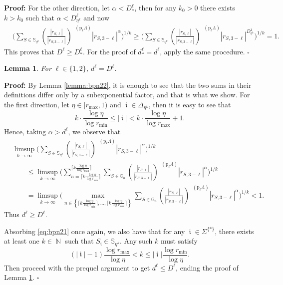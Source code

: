 \documentclass[a4paper, 11pt]{article}
\newenvironment{Proof}{\noindent \textbf{Proof:}}{\hfill$\square$\\}
\DeclareMathOperator{\N}{\mathbb{N}}
\DeclareMathOperator{\iii}{\mathfrak{i}}
\DeclareMathOperator{\dB}{\dim_{\mathrm{B}}}
\numberwithin{equation}{section}
\theoremstyle{plain}
\newtheorem{lemma}[theorem]{Lemma}
\theoremstyle{remark}
\theoremstyle{definition}
\begin{document}
\begin{Proof}
For the other direction, let $\alpha < D_*^\ell$, then for any $k_0 > 0$ there exists $k > k_0$ such that $\alpha< D_{\eta^k}^\ell$ and now
\begin{align*}
&\Bigg( \sum_{S \in \mathbb{S}_{\eta^k}} \left( \frac{|r_{S,\ell}|}{|r_{S,3-\ell}|} \right)^{\dB(\mathrm{p}_\ell\Lambda)} |r_{S,3-\ell}|^{\alpha}\Bigg)^{1/k} \geq \Bigg( \sum_{S \in \mathbb{S}_{\eta^k}} \left( \frac{|r_{S,\ell}|}{|r_{S,3-\ell}|} \right)^{\dB(\mathrm{p}_\ell\Lambda)} |r_{S,3-\ell}|^{D_{\eta^k}^1}\Bigg)^{1/k} = 1.
\end{align*}
This proves that $D^\ell \geq D_*^\ell$. For the proof of $d_*^\ell=d^\ell$, apply the same procedure.
\end{Proof}

\begin{lemma} \label{Lemma:bpn2} For $\ell \in \{1,2\}$, $d^\ell = D^\ell$.
\end{lemma}
\begin{Proof}
By Lemma \ref{lemma:bpn22}, it is enough to see that the two sums in their definitions differ only by a subexponential factor, and that is what we show. For the first direction, let $\eta \in [r_{\max},1)$ and $\iii \in \Delta_{\eta^k}$, then it is easy to see that
\begin{equation}\label{eq:bpn21}
k \cdot \frac{\log \eta}{\log r_{\min}} \leq |\iii| < k \cdot \frac{\log \eta}{\log r_{\max}} + 1.
\end{equation}
Hence, taking $\alpha > d^\ell$, we observe that
\begin{align*}
&\limsup_{k \to \infty} \Bigg( \sum_{S \in \mathbb{S}_{\eta^k}} \left( \frac{|r_{S,\ell}|}{|r_{S,3-\ell}|} \right)^{\dB(\mathrm{p}_\ell\Lambda)} |r_{S,3-\ell}|^{\alpha}\Bigg)^{1/k} \\
& \qquad \leq \limsup_{k \to \infty} \Bigg(\sum_{n = \big\lceil k \frac{\log \eta}{\log r_{\min}} \big\rceil }^{ \big\lceil k \frac{\log \eta}{\log r_{\max}} \big\rceil }\sum_{S \in \mathbb{G}_{n}} \left( \frac{|r_{S,\ell}|}{|r_{S,3-\ell}|} \right)^{\dB(\mathrm{p}_\ell\Lambda)} |r_{S,3-\ell}|^{\alpha}\Bigg)^{1/k} \\
& \qquad = \limsup_{k \to \infty} \Bigg(\max_{n \in\left\{ \big\lceil k \frac{\log \eta}{\log r_{\min}} \big\rceil,\ldots,\big\lceil k \frac{\log \eta}{\log r_{\max}} \big\rceil \right\} }\sum_{S \in \mathbb{G}_{n}} \left( \frac{|r_{S,\ell}|}{|r_{S,3-\ell}|} \right)^{\dB(\mathrm{p}_\ell\Lambda)} |r_{S,3-\ell}|^{\alpha}\Bigg)^{1/k} < 1.
\end{align*}
Thus $d^\ell \geq D^\ell$.

Absorbing \eqref{eq:bpn21} once again, we also have that for any $\iii\in\Sigma^{\{*\}}$, there exists at least one $k\in\N$ such that $S_{\iii}\in\mathbb{S}_{\eta^k}$. Any such $k$ must satisfy
\[ (|\iii|-1) \frac{\log r_{\max}}{\log \eta} < k \leq |\iii|\frac{\log r_{\min}}{\log \eta}.\]
Then proceed with the prequel argument to get $d^\ell \leq D^\ell$, ending the proof of Lemma \ref{Lemma:bpn2}. \end{Proof}
\end{document}
